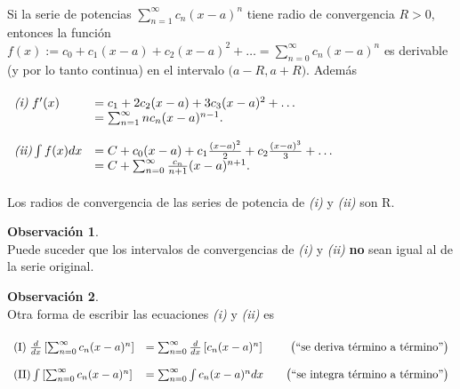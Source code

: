 \documentclass{article}
\theoremstyle{definition}
\newtheorem*{obs}{Observación}
\theoremstyle{remark}
\begin{document}
\begin{teo} \; \\
  Si la serie de potencias $\sum_{n=1}^{\infty}{c_n(x-a)^n}$ tiene radio de convergencia $R>0$, entonces la función $f(x) := c_0 + c_1 (x-a) + c_2 (x-a)^2 + \dots = \sum_{n=0}^{\infty}{c_n(x-a)^n}$ es derivable (y por lo tanto continua) en el intervalo $\big(a-R, a + R\big)$. Además  \\\\ $\begin{array}{ll}
    \emph{(i)\phantom{i}} f'(x) & = c_1+2c_2(x-a)+3c_3(x-a)^2+\dots \\
                                & = \sum_{n=1}^{\infty}{nc_n(x-a)^{n-1}}.  \\\\
    \emph{(ii)} \int{f(x)dx} & = C+c_0(x-a)+c_1\frac{(x-a)^2}{2}+c_2\frac{(x-a)^3}{3}+\dots \\ 
                             & =C+\sum_{n=0}^{\infty}{\frac{c_n}{n+1}(x-a)^{n+1}}. 
  \end{array}$ \\ \\ Los radios de convergencia de las series de potencia de \emph{(i)} y \emph{(ii)} son R.
\end{teo} \pagebreak
\begin{obs} \; \\
  Puede suceder que los intervalos de convergencias de \emph{(i)} y \emph{(ii)} \textbf{no} sean igual al de la serie original.
\end{obs}
 
\begin{obs} \; \\
Otra forma de escribir las ecuaciones \emph{(i)} y \emph{(ii)} es \\ \\ $\begin{array}{llcr}
\text{(I)\phantom{i}} \frac{d}{dx} \left[\sum_{n=0}^{\infty}{c_n(x-a)^n}\right] &  =\sum_{n=0}^{\infty}{\frac{d}{dx}\left[c_n(x-a)^n\right]} & & \text{\big(``se deriva término a término''\big)}\\ \\
\text{(II)} \int{\left[\sum_{n=0}^{\infty}{c_n(x-a)^n}\right]} &  =\sum_{n=0}^{\infty}{\int{c_n(x-a)^ndx}}& & \text{\big(``se integra término a término''\big)}\\

\end{array}$
\end{obs}
\end{document}
